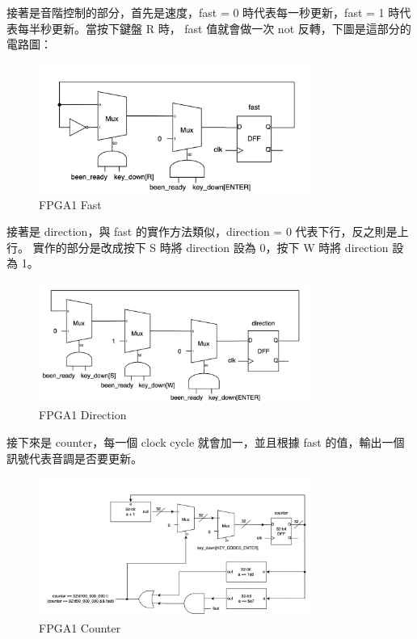 \documentclass[10.5pt,compsoc,UTF8]{CjC}
\theoremstyle{mystyle}
\begin{document}
接著是音階控制的部分，首先是速度，fast = 0 時代表每一秒更新，fast = 1 時代表每半秒更新。當按下鍵盤 R 時，
fast 值就會做一次 not 反轉，下圖是這部分的電路圖：

\begin{figure}[h!]
  \centering
  \includegraphics[width=0.8\textwidth]{./img/FPGA1-fast.png}
  \caption{FPGA1 Fast}
  \label{fig:FPGA1-fast}
\end{figure}

接著是 direction，與 fast 的實作方法類似，direction = 0 代表下行，反之則是上行。
實作的部分是改成按下 S 時將 direction 設為 0，按下 W 時將 direction 設為 1。

\begin{figure}[h!]
  \centering
  \includegraphics[width=0.8\textwidth]{./img/FPGA1-direction.png}
  \caption{FPGA1 Direction}
  \label{fig:FPGA1-direction}
\end{figure}

\newpage

接下來是 counter，每一個 clock cycle 就會加一，並且根據 fast 的值，輸出一個訊號代表音調是否要更新。

\begin{figure}[h!]
  \centering
  \includegraphics[width=0.8\textwidth]{./img/FPGA1-counter.png}
  \caption{FPGA1 Counter}
  \label{fig:FPGA1-counter}
\end{figure}
\end{document}
